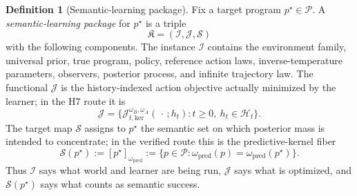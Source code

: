 \documentclass[11pt]{article}
\theoremstyle{definition}
\newtheorem{definition}[theorem]{Definition}
\theoremstyle{remark}
\newcommand{\Pcal}{\mathcal{P}}
\newcommand{\Hcal}{\mathcal{H}}
\newcommand{\Scal}{\mathcal{S}}
\begin{document}
\begin{definition}[Semantic-learning package]
\label{def:semantic-learning-package}
Fix a target program $p^\star\in\Pcal$. A \emph{semantic-learning package} for $p^\star$ is a triple
\[
\mathfrak K=(\mathcal I,\mathcal J,\Scal)
\]
with the following components. The instance $\mathcal I$ contains the environment family, universal prior, true program, policy, reference action laws, inverse-temperature parameters, observers, posterior process, and infinite trajectory law. The functional $\mathcal J$ is the history-indexed action objective actually minimized by the learner; in the H7 route it is
\[
\mathcal J
=\{\mathcal J_{t,\mathrm{ker}}^{\omega_B,\omega_A}(\,\cdot\,;h_t):t\ge0,\ h_t\in\Hcal_t\}.
\]
The target map $\Scal$ assigns to $p^\star$ the semantic set on which posterior mass is intended to concentrate; in the verified route this is the predictive-kernel fiber
\[
\Scal(p^\star)
:=
[p^\star]_{\omega_{\mathrm{pred}}}
:=
\{p\in\Pcal:\omega_{\mathrm{pred}}(p)=\omega_{\mathrm{pred}}(p^\star)\}.
\]
Thus $\mathcal I$ says what world and learner are being run, $\mathcal J$ says what is optimized, and $\Scal(p^\star)$ says what counts as semantic success.
\end{definition}
\end{document}
